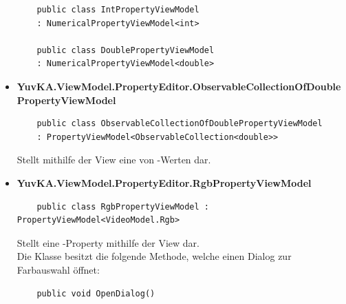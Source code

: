 \begin{itemize}
	\begin{verbatim}
	public class IntPropertyViewModel 
	: NumericalPropertyViewModel<int>
	
	public class DoublePropertyViewModel 
	: NumericalPropertyViewModel<double>
	\end{verbatim}				

\item{\textbf{YuvKA.ViewModel.PropertyEditor.ObservableCollectionOfDoublePropertyViewModel}}
	\begin{verbatim}
	public class ObservableCollectionOfDoublePropertyViewModel 
	: PropertyViewModel<ObservableCollection<double>>
	\end{verbatim}
	Stellt mithilfe der View eine  von -Werten dar.

\item{\textbf{YuvKA.ViewModel.PropertyEditor.RgbPropertyViewModel}}
	\begin{verbatim}
	public class RgbPropertyViewModel : PropertyViewModel<VideoModel.Rgb>
	\end{verbatim}
	Stellt eine -Property mithilfe der View dar.\\
	Die Klasse besitzt die folgende Methode, welche einen Dialog zur Farbauswahl öffnet:
	\begin{verbatim}
	public void OpenDialog()
	\end{verbatim}

\end{itemize}


